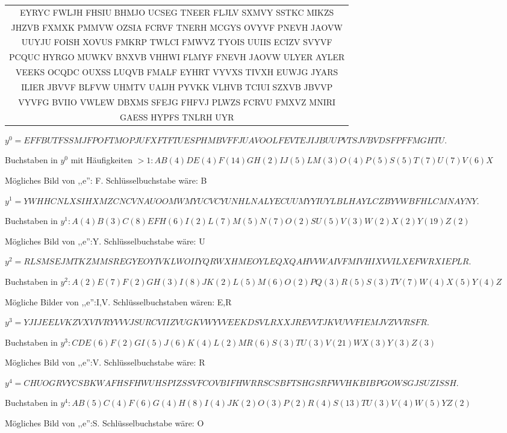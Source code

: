 \documentclass[a4paper]{article}
\begin{document}
\begin{multicols}{3}
    \begin{tabular}{c}
     EYRYC FWLJH FHSIU BHMJO UCSEG TNEER FLJLV SXMVY SSTKC MIKZS \\
     JHZVB FXMXK PMMVW OZSIA FCRVF TNERH MCGYS OVYVF PNEVH JAOVW \\
     UUYJU FOISH XOVUS FMKRP TWLCI FMWVZ TYOIS UUIIS ECIZV SVYVF \\
     PCQUC HYRGO MUWKV BNXVB VHHWI FLMYF FNEVH JAOVW ULYER AYLER \\
     VEEKS OCQDC OUXSS LUQVB FMALF EYHRT VYVXS TIVXH EUWJG JYARS \\
     ILIER JBVVF BLFVW UHMTV UAIJH PYVKK VLHVB TCIUI SZXVB JBVVP \\
     VYVFG BVIIO VWLEW DBXMS SFEJG FHFVJ PLWZS FCRVU FMXVZ MNIRI \\
    GAESS HYPFS TNLRH UYR                    
    \end{tabular}
    \begin{itemize*}
        \item $y^0 =EFFBUTFSSMJFPOFTMOPJUFXFTFTUESPHMBVFFJUAVOOLFEVTEJIJBUUPVTSJVBVDSFPFFMGHTU$.
        \item Buchstaben in $y^0$ mit Häufigkeiten $>1:AB(4)DE(4)F(14)GH(2)IJ(5)LM(3)O(4)P(5)S(5)T(7)U(7)V(6)X$
        \item Mögliches Bild von ,,e'': F. Schlüsselbuchstabe wäre: B
        \item $y^1 =YWHHCNLXSIHXMZCNCVNAUOOMWMYUCVCYUNHLNALYECUUMYYIUYLBLHAYLCZBYVWBFHLCMNAYNY$.
        \item Buchstaben in $y^1:A(4)B(3)C(8)EFH(6)I(2)L(7)M(5)N(7)O(2)SU(5)V(3)W(2)X(2)Y(19)Z(2)$
        \item Mögliches Bild von ,,e'':Y. Schlüsselbuchstabe wäre: U
        \item $y^2 =RLSMSEJMTKZMMSREGYEOYIVKLWOIIYQRWXHMEOYLEQXQAHVVWAIVFMIVHIXVVILXEFWRXIEPLR$.
        \item Buchstaben in $y^2:A(2)E(7)F(2)GH(3)I(8)JK(2)L(5)M(6)O(2)PQ(3)R(5)S(3)TV(7)W(4)X(5)Y(4)Z$
        \item Mögliche Bilder von ,,e'':I,V. Schlüsselbuchstaben wären: E,R
        \item $y^3 =YJIJEELVKZVXVIVRYVVVJSURCVIIZVUGKVWYVVEEKDSVLRXXJREVVTJKVUVVFIEMJVZVVRSFR$.
        \item Buchstaben in $y^3 :CDE(6)F(2)GI(5)J(6)K(4)L(2)MR(6)S(3)TU(3)V(21)WX(3)Y(3)Z(3)$
        \item Mögliches Bild von ,,e'':V. Schlüsselbuchstabe wäre: R
        \item $y^4 =CHUOGRVYCSBKWAFHSFHWUHSPIZSSVFCOVBIFHWRRSCSBFTSHGSRFWVHKBIBPGOWSGJSUZISSH$.
        \item Buchstaben in $y^4 :AB(5)C(4)F(6)G(4)H(8)I(4)JK(2)O(3)P(2)R(4)S(13)TU(3)V(4)W(5)YZ(2)$
        \item Mögliches Bild von ,,e'':S. Schlüsselbuchstabe wäre: O
    \end{itemize*}


\end{multicols}
\end{document}
